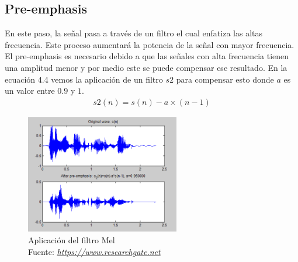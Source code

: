 	\subsection{Pre-emphasis}
	En este paso, la señal pasa a través de un filtro el cual enfatiza las altas frecuencia. Este proceso aumentará la potencia de la señal con mayor frecuencia. El pre-emphasis es necesario debido a que las señales con alta frecuencia tienen una amplitud menor y por medio este se puede compensar ese resultado. En la ecuación 4.4 vemos la aplicación de un filtro $s2$ para compensar esto donde $a$ es un valor entre $0.9$ y $1$.
	\begin{equation}
	\label{STs23}
	\begin{aligned}
		s2(n) = s(n) - a\times(n-1) 
	\end{aligned}
	\end{equation}
	 \begin{figure}[H]
	 	\centering
	 	\includegraphics[width=0.6\textwidth]{Figures/emphasis.png}
	 	\caption{Aplicación del filtro Mel \\ Fuente:  \href{https://www.researchgate.net/figure/Speech-signal-after-per-emphasis_fig7_305692039}{\textit{https://www.researchgate.net}}}
	 	\label{onda}
	 	
	 \end{figure}
